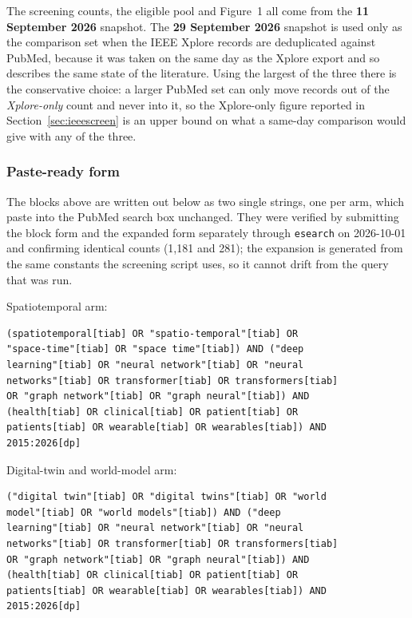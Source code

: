 \documentclass[journal]{IEEEtran}
\begin{document}
\noindent The screening counts, the eligible pool and Figure~1 all come from the
\textbf{11 September 2026} snapshot. The \textbf{29 September 2026} snapshot is used
only as the comparison set when the IEEE Xplore records are deduplicated against
PubMed, because it was taken on the same day as the Xplore export and so describes
the same state of the literature. Using the largest of the three there is the
conservative choice: a larger PubMed set can only move records out of the
\emph{Xplore-only} count and never into it, so the Xplore-only figure reported in
Section~\ref{sec:ieeescreen} is an upper bound on what a same-day comparison would
give with any of the three.

\subsubsection*{Paste-ready form}
The blocks above are written out below as two single strings, one per arm, which
paste into the PubMed search box unchanged. They were verified by submitting the
block form and the expanded form separately through \texttt{esearch} on
2026-10-01 and confirming identical counts (1{,}181 and 281); the
expansion is generated from the same constants the screening script uses, so it
cannot drift from the query that was run.

\noindent Spatiotemporal arm:

{\scriptsize\begin{verbatim}
(spatiotemporal[tiab] OR "spatio-temporal"[tiab] OR
"space-time"[tiab] OR "space time"[tiab]) AND ("deep
learning"[tiab] OR "neural network"[tiab] OR "neural
networks"[tiab] OR transformer[tiab] OR transformers[tiab]
OR "graph network"[tiab] OR "graph neural"[tiab]) AND
(health[tiab] OR clinical[tiab] OR patient[tiab] OR
patients[tiab] OR wearable[tiab] OR wearables[tiab]) AND
2015:2026[dp]
\end{verbatim}}

\noindent Digital-twin and world-model arm:

{\scriptsize\begin{verbatim}
("digital twin"[tiab] OR "digital twins"[tiab] OR "world
model"[tiab] OR "world models"[tiab]) AND ("deep
learning"[tiab] OR "neural network"[tiab] OR "neural
networks"[tiab] OR transformer[tiab] OR transformers[tiab]
OR "graph network"[tiab] OR "graph neural"[tiab]) AND
(health[tiab] OR clinical[tiab] OR patient[tiab] OR
patients[tiab] OR wearable[tiab] OR wearables[tiab]) AND
2015:2026[dp]
\end{verbatim}}
\end{document}
